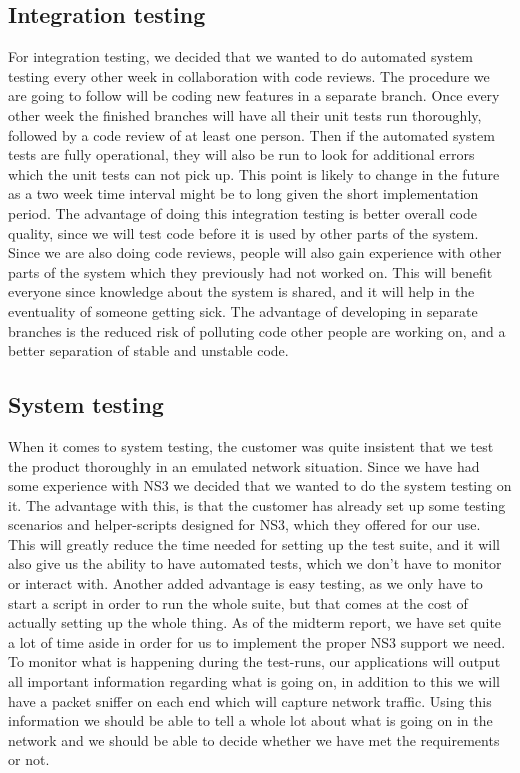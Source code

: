     \subsection{Integration testing}\label{Integration testing}
   For integration testing, we decided that we wanted to do automated system testing every other week in collaboration with code reviews. The procedure we are going to follow will be coding new features in a separate branch. Once every other week the finished branches will have all their unit tests run thoroughly, followed by a code review of at least one person. Then if the automated system tests are fully operational, they will also be run to look for additional errors which the unit tests can not pick up. This point is likely to change in the future as a two week time interval might be to long given the short implementation period. The advantage of doing this integration testing is better overall code quality, since we will test code before it is used by other parts of the system. Since we are also doing code reviews, people will also gain experience with other parts of the system which they previously had not worked on. This will benefit everyone since knowledge about the system is shared, and it will help in the eventuality of someone getting sick. The advantage of developing in separate branches is the reduced risk of polluting code other people are working on, and a better separation of stable and unstable code.

    \subsection{System testing}\label{System testing}
    When it comes to system testing, the customer was quite insistent that we test the product thoroughly in an emulated network situation. Since we have had some experience with NS3 we decided that we wanted to do the system testing on it. The advantage with this, is that the customer has already set up some testing scenarios and helper-scripts designed for NS3, which they offered for our use. This will greatly reduce the time needed for setting up the test suite, and it will also give us the ability to have automated tests, which we don’t have to monitor or interact with. Another added advantage is easy testing, as we only have to start a script in order to run the whole suite, but that comes at the cost of actually setting up the whole thing. As of the midterm report, we have set quite a lot of time aside in order for us to implement the proper NS3 support we need. To monitor what is happening during the test-runs, our applications will output all important information regarding what is going on, in addition to this we will have a \gls{packet sniffer} on each end which will capture network traffic. Using this information we should be able to tell a whole lot about what is going on in the network and we should be able to decide whether we have met the requirements or not.

